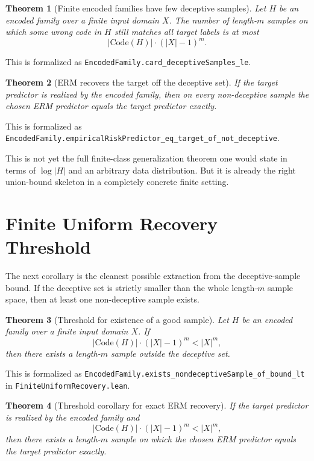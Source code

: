 \documentclass[11pt]{article}
\newtheorem{theorem}{Theorem}[section]
\theoremstyle{remark}
\begin{document}
\begin{theorem}[Finite encoded families have few deceptive samples]
Let \(H\) be an encoded family over a finite input domain \(X\).  The number of
length-\(m\) samples on which some wrong code in \(H\) still matches all target
labels is at most
\[
  |\mathrm{Code}(H)| \cdot (|X|-1)^m.
\]
\end{theorem}

\noindent
This is formalized as
\texttt{EncodedFamily.card\_deceptiveSamples\_le}.

\begin{theorem}[ERM recovers the target off the deceptive set]
If the target predictor is realized by the encoded family, then on every
non-deceptive sample the chosen ERM predictor equals the target predictor
exactly.
\end{theorem}

\noindent
This is formalized as
\texttt{EncodedFamily.empiricalRiskPredictor\_eq\_target\_of\_not\_deceptive}.

This is not yet the full finite-class generalization theorem one would state in
terms of \(\log |H|\) and an arbitrary data distribution.  But it is already the
right union-bound skeleton in a completely concrete finite setting.

\section{Finite Uniform Recovery Threshold}

The next corollary is the cleanest possible extraction from the deceptive-sample
bound.  If the deceptive set is strictly smaller than the whole length-\(m\)
sample space, then at least one non-deceptive sample exists.

\begin{theorem}[Threshold for existence of a good sample]
Let \(H\) be an encoded family over a finite input domain \(X\).  If
\[
  |\mathrm{Code}(H)| \cdot (|X|-1)^m < |X|^m,
\]
then there exists a length-\(m\) sample outside the deceptive set.
\end{theorem}

\noindent
This is formalized as
\texttt{EncodedFamily.exists\_nondeceptiveSample\_of\_bound\_lt} in
\texttt{FiniteUniformRecovery.lean}.

\begin{theorem}[Threshold corollary for exact ERM recovery]
If the target predictor is realized by the encoded family and
\[
  |\mathrm{Code}(H)| \cdot (|X|-1)^m < |X|^m,
\]
then there exists a length-\(m\) sample on which the chosen ERM predictor equals
the target predictor exactly.
\end{theorem}
\end{document}
